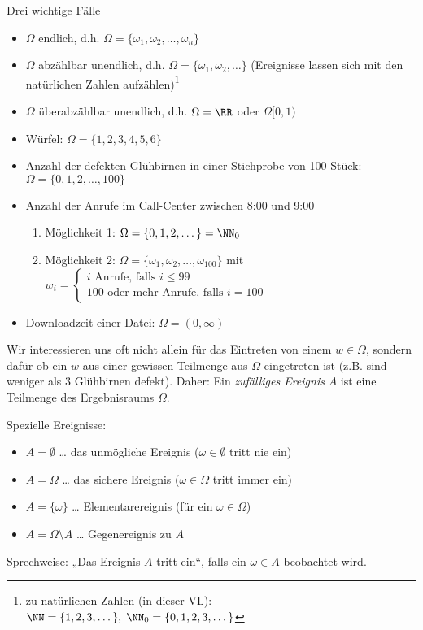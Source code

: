  Drei wichtige Fälle
\begin{itemize}
\item $\Omega$ endlich, d.h. $\Omega=\{\omega_1,\omega_2,\dots,\omega_n\}$
\item $\Omega$ abzählbar unendlich, d.h. $\Omega=\{\omega_1,\omega_2,\dots\}$ (Ereignisse lassen sich mit den natürlichen Zahlen aufzählen)\footnote{zu natürlichen Zahlen (in dieser VL): $\NN=\{1,2,3,\dots\}, \; \NN_0=\{0,1,2,3,\dots\}$}
\item $\Omega$ überabzählbar unendlich, d.h. $\Omega=\RR$ oder $\Omega [0,1)$
\end{itemize}

\begin{itemize}
\item Würfel: $\Omega=\{1,2,3,4,5,6\}$
\item Anzahl der defekten Glühbirnen in einer Stichprobe von 100 Stück: $\Omega=\{0,1,2,\dots,100\}$
\item Anzahl der Anrufe im Call-Center zwischen 8:00 und 9:00
\begin{enumerate}
\item Möglichkeit 1: $\Omega = \{0,1,2,\dots\}=\NN_0$
\item Möglichkeit 2: $\Omega = \{\omega_1,\omega_2,\dots, \omega_{100}\}$ mit $w_i =\begin{cases}
i \text{ Anrufe, falls }i\leq 99\\
100 \text{ oder mehr Anrufe, falls }i=100
\end{cases}$
\end{enumerate}
\item Downloadzeit einer Datei: $\Omega = (0,\infty)$
\end{itemize}
Wir interessieren uns oft nicht allein für das Eintreten von einem $w\in \Omega$, sondern dafür ob ein $w$ aus einer gewissen Teilmenge aus $\Omega$ eingetreten ist (z.B. sind weniger als $3$ Glühbirnen defekt). Daher:
 Ein \emph{zufälliges Ereignis} $A$ ist eine Teilmenge des Ergebnisraums $\Omega$. 

Spezielle Ereignisse:
\begin{itemize}
\item $A = \emptyset$ \tab … das unmögliche Ereignis ($\omega\in \emptyset$ tritt nie ein)
\item $A=\Omega$ \tab … das sichere Ereignis ($\omega \in \Omega$ tritt immer ein)
\item $A=\{\omega\}$ \tab … Elementarereignis (für ein $\omega \in \Omega$)
\item $\bar A = \Omega \setminus A$ \tab … Gegenereignis zu $A$
\end{itemize}
Sprechweise: „Das Ereignis $A$ tritt ein“, falls ein $\omega \in A$ beobachtet wird.

